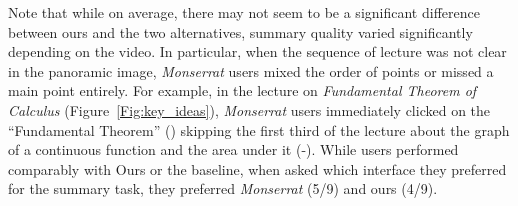 Note that while on average, there may not seem to be a significant difference
between ours and the two alternatives, summary quality varied
significantly depending on the video. In particular, when the sequence of lecture was not clear in the panoramic image, \textit{Monserrat} users mixed the order of points or missed a main point entirely. For example, in the lecture on \textit{Fundamental Theorem of Calculus} (Figure~\ref{Fig:key_ideas}), \textit{Monserrat} users immediately clicked on the ``Fundamental Theorem'' () skipping the first third of the lecture about the graph of a continuous function and the area under it (-). While users performed comparably with Ours or the baseline, when asked which interface they preferred for the summary task, they preferred \textit{Monserrat} (5/9) and ours (4/9). 

